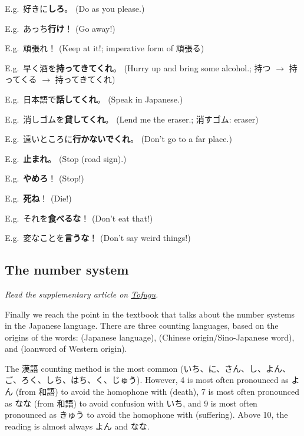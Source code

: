 \documentclass[../nihongo-gakushuu-kyouzai.tex]{subfiles}
\begin{document}

E.g.\ 好きに\textbf{しろ}。 (Do as you please.)

E.g.\ あっち\textbf{行け}！ (Go away!)

E.g.\ 頑張れ！ (Keep at it!; imperative form of 頑張る)

E.g.\ 早く酒を\textbf{持ってきてくれ}。 (Hurry up and bring some alcohol.; 持つ $\to$ 持ってくる $\to$ 持ってきてくれ)

E.g.\ 日本語で\textbf{話してくれ}。 (Speak in Japanese.)

E.g.\ 消しゴムを\textbf{貸してくれ}。 (Lend me the eraser.; 消すゴム: eraser)

E.g.\ 遠いところに\textbf{行かないでくれ}。 (Don't go to a far place.)

E.g.\ \textbf{止まれ}。 (Stop (road sign).)

E.g.\ \textbf{やめろ}！ (Stop!)

E.g.\ \textbf{死ね}！ (Die!)


E.g.\ それを\textbf{食べるな}！ (Don't eat that!)

E.g.\ 変なことを\textbf{言うな}！ (Don't say weird things!)


\subsection{The number system} \label{sec:the-number-system}
\emph{Read the supplementary article on \href{https://www.tofugu.com/japanese/japanese-counters-guide/}{Tofugu}.}

Finally we reach the point in the textbook that talks about the number systems in the Japanese language. There are three counting languages, based on the origins of the words:  (Japanese language),  (Chinese origin/Sino-Japanese word), and  (loanword of Western origin).

The 漢語 counting method is the most common (いち、に、さん、し、よん、ご、ろく、しち、はち、く、じゅう). However, 4 is most often pronounced as よん (from 和語) to avoid the homophone with  (death), 7 is most often pronounced as なな (from 和語) to avoid confusion with いち, and 9 is most often pronounced as きゅう to avoid the homophone with  (suffering). Above 10, the reading is almost always よん and なな.
\end{document}
